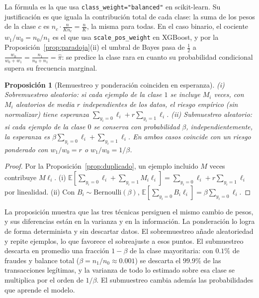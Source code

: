 \documentclass[11pt]{article}
\newtheorem{proposicion}[teorema]{Proposición}
\theoremstyle{definition}
\theoremstyle{remark}
\newcommand{\E}{\mathbb{E}}
\begin{document}
\noindent La fórmula es la que usa \texttt{class\_weight="balanced"} en scikit-learn. Su justificación es que iguala la contribución total de cada clase: la suma de los pesos de la clase $c$ es $n_c\cdot\frac{n}{Kn_c}=\frac nK$, la misma para todas. En el caso binario, el cociente $w_1/w_0=n_0/n_1$ es el que usa \texttt{scale\_pos\_weight} en XGBoost, y por la Proposición~\ref{prop:paradoja}(ii) el umbral de Bayes pasa de $\frac12$ a $\frac{w_0}{w_0+w_1}=\frac{n_1}{n_0+n_1}=\hat\pi$: se predice la clase rara en cuanto su probabilidad condicional supera su frecuencia marginal.

\begin{proposicion}[Remuestreo y ponderación coinciden en esperanza]\label{prop:remuestreo}
\noindent (i) \emph{Sobremuestreo aleatorio}: si cada ejemplo de la clase $1$ se incluye $M_i$ veces, con $M_i$ aleatorios de media $r$ independientes de los datos, el riesgo empírico (sin normalizar) tiene esperanza $\sum_{y_i=0}\ell_i+r\sum_{y_i=1}\ell_i$. (ii) \emph{Submuestreo aleatorio}: si cada ejemplo de la clase $0$ se conserva con probabilidad $\beta$, independientemente, la esperanza es $\beta\sum_{y_i=0}\ell_i+\sum_{y_i=1}\ell_i$. En ambos casos coincide con un riesgo ponderado con $w_1/w_0=r$ o $w_1/w_0=1/\beta$.
\end{proposicion}
\begin{proof}
\noindent Por la Proposición~\ref{prop:duplicado}, un ejemplo incluido $M$ veces contribuye $M\ell_i$. (i) $\E[\sum_{y_i=0}\ell_i+\sum_{y_i=1}M_i\ell_i]=\sum_{y_i=0}\ell_i+r\sum_{y_i=1}\ell_i$ por linealidad. (ii) Con $B_i\sim\mathrm{Bernoulli}(\beta)$, $\E[\sum_{y_i=0}B_i\ell_i]=\beta\sum_{y_i=0}\ell_i$.
\end{proof}

\noindent La proposición muestra que las tres técnicas persiguen el mismo cambio de pesos, y sus diferencias están en la varianza y en la información. La ponderación lo logra de forma determinista y sin descartar datos. El sobremuestreo añade aleatoriedad y repite ejemplos, lo que favorece el sobreajuste a esos puntos. El submuestreo descarta en promedio una fracción $1-\beta$ de la clase mayoritaria: con $0.1\%$ de fraudes y balance total ($\beta=n_1/n_0\approx0.001$) se descarta el $99.9\%$ de las transacciones legítimas, y la varianza de todo lo estimado sobre esa clase se multiplica por el orden de $1/\beta$. El submuestreo cambia además las probabilidades que aprende el modelo.
\end{document}
